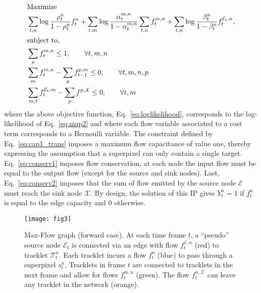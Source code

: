   \begin{subequations}
  \label{eq:int_prog}
  \begin{align}
  \intertext{Maximize}
  &\sum_{t,n} \log{\frac{\rho_t^n}{1-\rho_t^n}}f_t^n + \sum_{t,m} \log{\frac{\alpha_t^{m,n}}{1-\alpha_t^{m,n}}}\sum_{t,n}f_t^{m,n} + \sum_{t,n} \log{\frac{\beta_t^n}{1-\beta_t^n}}f_t^{\mathcal{E}_t,n},\label{eq:loglikelihood}\\
  \intertext{subject to,}
  &\sum\limits_{n}f_t^{m,n} \leq 1, \qquad \forall t,m,n \label{eq:cap1_trans}\\
  &\sum_m f_t^{m,n} - \sum_p f_{t-1}^{p,m} \leq 0, \qquad \forall t,m,n,p \label{eq:conserv1}\\
  &\sum_{m,t} f_t^{\mathcal{E}_t,m} - \sum_p f^{p,\mathcal{X}} \leq 0, \qquad \forall t,m\label{eq:conserv2}
  \end{align}
  \end{subequations}
\noindent
where the above objective function, Eq.~\eqref{eq:loglikelihood}, corresponds to the log-likelihood of Eq.~\eqref{eq:map2} and where each flow variable associated to a cost term corresponds to a Bernoulli variable. The constraint defined by Eq.~\eqref{eq:cap1_trans} imposes a maximum flow capacitance of value one, thereby expressing the assumption that a superpixel can only contain a single target. Eq.~\eqref{eq:conserv1} imposes flow conservation, \ie at each node the input flow must be equal to the output flow (except for the source and sink nodes). Last, Eq.~\eqref{eq:conserv2} imposes that the sum of flow emitted by the source node $\mathcal{E}$ must reach the sink node $\mathcal{X}$. By design, the solution of this IP gives $Y_t^n=1$ if $f_t^n$ is equal to the edge capacity and 0 otherwise.
\begin{figure}[t]
\centering
\texttt{[image: fig3]}
\caption{Max-Flow graph (forward case). At each time frame $t$, a ``pseudo'' source node $\mathcal{E}_t$ is connected via an edge with flow $f_{t}^{\mathcal{E},n}$ (red) to tracklet $\mathcal{T}_t^n$. Each tracklet incurs a flow $f_t^n$ (blue) to pass through a superpixel $s_t^n$. Tracklets in frame $t$ are connected to tracklets in the next frame and allow for flows $f_{t}^{m,n}$ (green). The flow $f_{t}^{n,\mathcal{X}}$ can leave any tracklet in the network (orange).}
\label{fig:mcf}
\end{figure}

